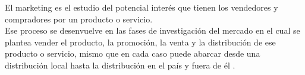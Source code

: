 
El marketing es el estudio del potencial interés que tienen los vendedores y compradores por un producto o servicio. \\

Ese proceso se desenvuelve en las fases de investigación del mercado en el cual se plantea vender el producto, la promoción, la venta y la distribución de ese producto o servicio, mismo que en cada caso puede abarcar desde una distribución local hasta la distribución en el país y fuera de él \cite{Marketing}. \\

